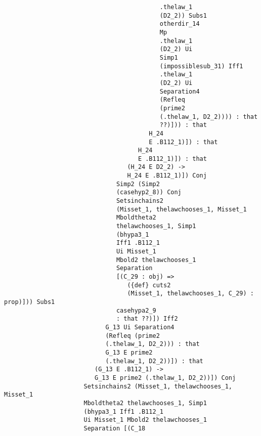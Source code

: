 \documentclass[12pt]{article}
\begin{document}
\begin{verbatim}
                                           .thelaw_1 
                                           (D2_2)) Subs1 
                                           otherdir_14 
                                           Mp 
                                           .thelaw_1 
                                           (D2_2) Ui 
                                           Simp1 
                                           (impossiblesub_31) Iff1 
                                           .thelaw_1 
                                           (D2_2) Ui 
                                           Separation4 
                                           (Refleq 
                                           (prime2 
                                           (.thelaw_1, D2_2)))) : that 
                                           ??)])) : that 
                                        H_24 
                                        E .B112_1)]) : that 
                                     H_24 
                                     E .B112_1)]) : that 
                                  (H_24 E D2_2) -> 
                                  H_24 E .B112_1)]) Conj 
                               Simp2 (Simp2 
                               (casehyp2_8)) Conj 
                               Setsinchains2 
                               (Misset_1, thelawchooses_1, Misset_1 
                               Mboldtheta2 
                               thelawchooses_1, Simp1 
                               (bhypa3_1 
                               Iff1 .B112_1 
                               Ui Misset_1 
                               Mbold2 thelawchooses_1 
                               Separation 
                               [(C_29 : obj) => 
                                  ({def} cuts2 
                                  (Misset_1, thelawchooses_1, C_29) : prop)])) Subs1 
                               casehypa2_9 
                               : that ??)]) Iff2 
                            G_13 Ui Separation4 
                            (Refleq (prime2 
                            (.thelaw_1, D2_2))) : that 
                            G_13 E prime2 
                            (.thelaw_1, D2_2))]) : that 
                         (G_13 E .B112_1) -> 
                         G_13 E prime2 (.thelaw_1, D2_2))]) Conj 
                      Setsinchains2 (Misset_1, thelawchooses_1, Misset_1 
                      Mboldtheta2 thelawchooses_1, Simp1 
                      (bhypa3_1 Iff1 .B112_1 
                      Ui Misset_1 Mbold2 thelawchooses_1 
                      Separation [(C_18 

\end{verbatim}
\end{document}
